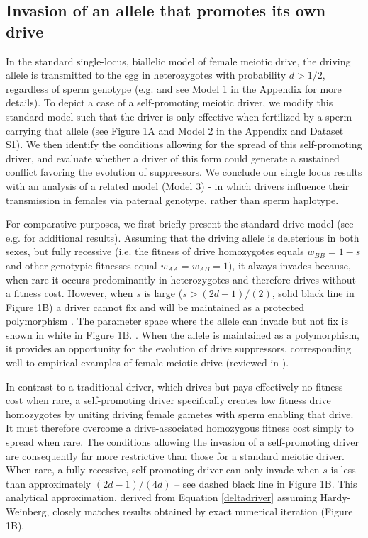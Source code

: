 \documentclass{pnastwo}
\begin{document}
\begin{article}
\subsection{Invasion of an allele that promotes its own drive}
In the standard single-locus, biallelic model of female meiotic drive,
the driving allele is transmitted to the egg in heterozygotes with
probability  $d > 1/2$, regardless of sperm genotype (e.g. \cite{Ubeda2004} and see Model 1 in the Appendix for more details). 
To depict a case of a self-promoting meiotic driver,  we modify this standard model such 
	that the driver is only effective when fertilized by a sperm carrying that allele (see Figure 1A and Model 2 	in the Appendix and Dataset S1). 
We then identify the conditions allowing for the spread of this self-promoting driver, 
	and evaluate whether a driver of this form could generate a sustained conflict favoring the evolution of suppressors. 
We conclude our single locus results with an analysis of a related model (Model 3) - in which
drivers influence their transmission in females via paternal genotype,
rather than sperm haplotype. 

For comparative purposes, we first briefly present the standard drive model 
	(see e.g. \cite{Prout1973,Ubeda2004} for additional results). 
Assuming that the driving allele is deleterious in both sexes, but fully recessive 
	(i.e. the fitness of drive homozygotes equals $w_{BB}=1-s$ and other genotypic fitnesses equal $w_{AA}=w_{AB}=1$), 
	it always invades because, when rare it occurs predominantly in heterozygotes and therefore drives without a fitness cost. 
However, when $s$ is large ($s>(2d-1)/(2)$, solid black line in Figure 1B) a driver cannot fix and
will be maintained as a protected polymorphism \cite{Prout1973}. 
The parameter space where the allele can invade but not fix is shown in white
        in Figure 1B. . 
When the allele is maintained as a polymorphism, it provides an opportunity for the evolution of
	drive suppressors, corresponding well to empirical examples of
        female meiotic drive (reviewed in \cite{Burt2006}). 

In contrast to a traditional driver, which drives but pays effectively
	no fitness cost when rare, 
a self-promoting driver specifically creates low fitness drive homozygotes 
	by uniting driving female gametes with sperm enabling that drive.
It must therefore overcome a drive-associated homozygous fitness cost simply to spread when rare. 
The conditions allowing the invasion of a self-promoting driver
 	are consequently far more restrictive than those for a standard meiotic driver.
When rare, a fully recessive, self-promoting driver can only invade when $s$ 
	is less than approximately $(2 d - 1)/(4 d)$ -- see dashed black line in Figure 1B. 
This analytical approximation, derived from Equation \eqref{deltadriver} assuming Hardy-Weinberg, 
	closely matches results obtained by exact numerical iteration (Figure 1B). 




\end{article}
\end{document}
